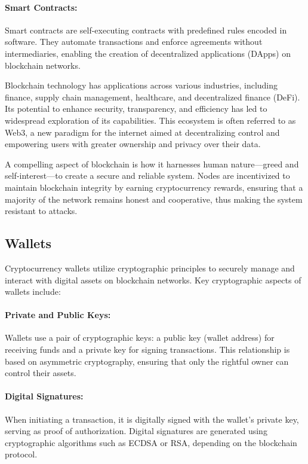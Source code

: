 \paragraph{Smart Contracts:}
Smart contracts are self-executing contracts with predefined rules encoded in
software. They automate transactions and enforce agreements without
intermediaries, enabling the creation of decentralized applications (DApps) on
blockchain networks.

Blockchain technology has applications across various industries, including
finance, supply chain management, healthcare, and decentralized finance (DeFi).
Its potential to enhance security, transparency, and efficiency has led to
widespread exploration of its capabilities. This ecosystem is often referred to
as Web3, a new paradigm for the internet aimed at decentralizing control and
empowering users with greater ownership and privacy over their data.

A compelling aspect of blockchain is how it harnesses human nature—greed and
self-interest—to create a secure and reliable system. Nodes are incentivized to
maintain blockchain integrity by earning cryptocurrency rewards, ensuring that
a majority of the network remains honest and cooperative, thus making the
system resistant to attacks.

\subsection{Wallets}
\label{subsec:wallets}

Cryptocurrency wallets utilize cryptographic principles to securely manage and
interact with digital assets on blockchain networks. Key cryptographic aspects
of wallets include:

\paragraph{Private and Public Keys:}
Wallets use a pair of cryptographic keys: a public key (wallet address) for
receiving funds and a private key for signing transactions. This relationship
is based on asymmetric cryptography, ensuring that only the rightful owner can
control their assets.

\paragraph{Digital Signatures:}
When initiating a transaction, it is digitally signed with the wallet's private
key, serving as proof of authorization. Digital signatures are generated using
cryptographic algorithms such as ECDSA or RSA, depending on the blockchain
protocol.

